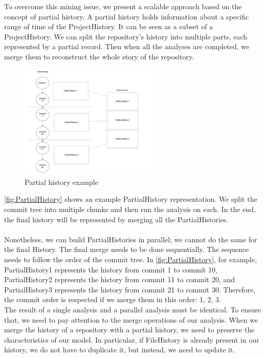 To overcome this mining issue, we present a scalable approach based on the concept of partial history.
A partial history holds information about a specific range of time of the ProjectHistory. 
It can be seen as a subset of a ProjectHistory. 
We can split the repository's history into multiple parts, each represented by a partial record. Then when all the analyses are completed, we merge them to reconstruct the whole story of the repository.


\begin{figure}
    \begin{center}
        \includegraphics[width=0.6\textwidth]{PartialHistory.png}
    \end{center}
    \caption{Partial history example}
    \label{fig:PartialHistory}
\end{figure}

\autoref{fig:PartialHistory} shows an example PartialHistory representation. 
We split the commit tree into multiple chunks and then run the analysis on each. 
In the end, the final history will be represented by merging all the PartialHistories. \\
\\
Nonetheless, we can build PartialHistories in parallel; we cannot do the same for the final History. 
The final merge needs to be done sequentially. The sequence needs to follow the order of the commit tree. 
In \autoref{fig:PartialHistory}, for example,
PartialHistory1 represents the history from commit 1 to commit 10, 
PartialHistory2 represents the history from commit 11 to commit 20, and 
PartialHistory3 represents the history from commit 21 to commit 30.
Therefore, the commit order is respected if we merge them in this order: 1, 2, 3. 
\\
The result of a single analysis and a parallel analysis must be identical. 
To ensure that, we need to pay attention to the merge operations of our analysis.
When we merge the history of a repository with a partial history, we need to preserve the characteristics of our model. 
In particular, if FileHistory is already present in our history, we do not have to duplicate it, but instead, we need to update it. 

